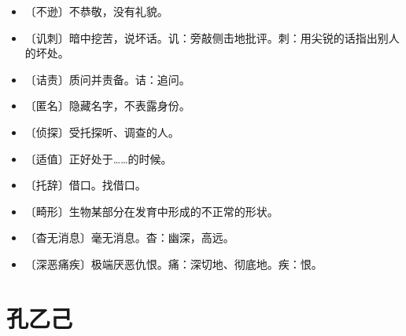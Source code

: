 \documentclass[12pt,UTF-8,openany]{ctexbook}
\begin{document}
\begin{itemize}
    \setlength\itemsep{-0.2em}
    \item 〔不逊〕不恭敬，没有礼貌。
    \item 〔讥刺〕暗中挖苦，说坏话。讥：旁敲侧击地批评。刺：用尖锐的话指出别人的坏处。
    \item 〔诘责〕质问并责备。诘：追问。
    \item 〔匿名〕隐藏名字，不表露身份。
    \item 〔侦探〕受托探听、调查的人。
    \item 〔适值〕正好处于……的时候。
    \item 〔托辞〕借口。找借口。
    \item 〔畸形〕生物某部分在发育中形成的不正常的形状。
    \item 〔杳无消息〕毫无消息。杳：幽深，高远。
    \item 〔深恶痛疾〕极端厌恶仇恨。痛：深切地、彻底地。疾：恨。
\end{itemize}

\chapter{孔乙己}
\end{document}
